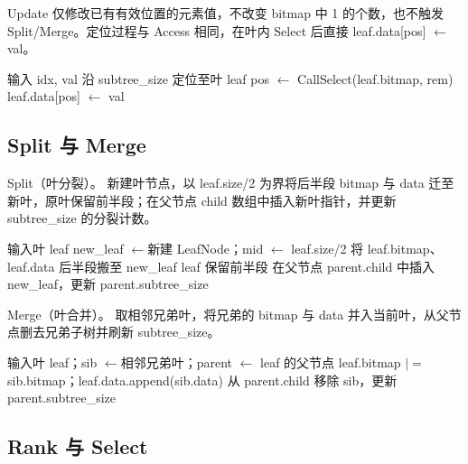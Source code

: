 Update 仅修改已有有效位置的元素值，不改变 bitmap 中 1 的个数，也不触发 Split/Merge。定位过程与 Access 相同，在叶内 Select 后直接 leaf.data[pos] $\gets$ val。

\begin{algorithm}[htbp]
  \caption{MiniArray.Update}
  \label{alg:miniarray-update}
  \begin{algorithmic}[1]
    \State 输入 idx, val
    \State 沿 subtree\_size 定位至叶 leaf
    \State pos $\gets$ Call{Select}(leaf.bitmap, rem)
    \State leaf.data[pos] $\gets$ val
  \end{algorithmic}
\end{algorithm}

\subsection{Split 与 Merge}

Split（叶分裂）。 新建叶节点，以 leaf.size/2 为界将后半段 bitmap 与 data 迁至新叶，原叶保留前半段；在父节点 child 数组中插入新叶指针，并更新 subtree\_size 的分裂计数。

\begin{algorithm}[htbp]
  \caption{MiniArray.Split（叶分裂）}
  \label{alg:miniarray-split}
  \begin{algorithmic}[1]
    \State 输入叶 leaf
    \State new\_leaf $\gets$新建 LeafNode；mid $\gets$ leaf.size/2
    \State 将 leaf.bitmap、leaf.data 后半段搬至 new\_leaf
    \State leaf 保留前半段
    \State 在父节点 parent.child 中插入 new\_leaf，更新 parent.subtree\_size
  \end{algorithmic}
\end{algorithm}

Merge（叶合并）。 取相邻兄弟叶，将兄弟的 bitmap 与 data 并入当前叶，从父节点删去兄弟子树并刷新 subtree\_size。

\begin{algorithm}[htbp]
  \caption{MiniArray.Merge（叶合并）}
  \label{alg:miniarray-merge}
  \begin{algorithmic}[1]
    \State 输入叶 leaf；sib $\gets$相邻兄弟叶；parent $\gets$ leaf 的父节点
    \State leaf.bitmap $\mathrel{|=}$ sib.bitmap；leaf.data.append(sib.data)
    \State 从 parent.child 移除 sib，更新 parent.subtree\_size
  \end{algorithmic}
\end{algorithm}

\subsection{Rank 与 Select}

